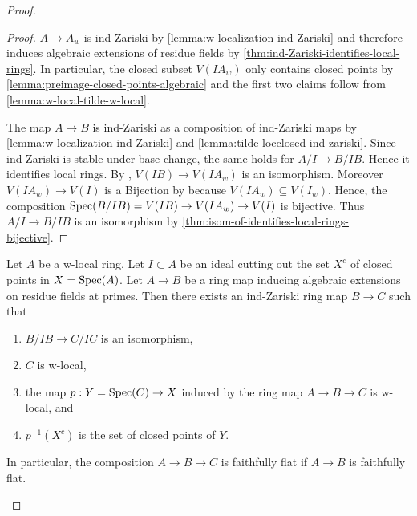 \begin{proof}
\begin{proof}
    $A \to A_w$ is ind-Zariski by \ref{lemma:w-localization-ind-Zariski} and therefore induces
    algebraic extensions of residue fields by \ref{thm:ind-Zariski-identifies-local-rings}.
    In particular, the closed subset $V(I A_w)$ only contains
    closed points by \ref{lemma:preimage-closed-points-algebraic} and
    the first two claims follow from \ref{lemma:w-local-tilde-w-local}.

    The map $A \to B$ is ind-Zariski as a composition of ind-Zariski maps by
    \ref{lemma:w-localization-ind-Zariski} and \ref{lemma:tilde-locclosed-ind-zariski}.
    Since ind-Zariski is stable under base change, the same holds for $A/I \to B/IB$.
    Hence it identifies local rings. By ,
    $V(IB) \to V(I A_w)$ is an isomorphism. Moreover
    $V(I A_{w}) \to V(I)$ is a Bijection by 
    because $V(I A_{w}) \subseteq V(I_w)$. Hence, the composition
    $\mathrm{Spec}(B / IB) = V(IB) \to V(I A_w) \to V(I)$ is bijective. Thus
    $A / I \to B / IB$ is an isomorphism by \ref{thm:isom-of-identifies-local-rings-bijective}.
\end{proof}

\begin{lemma}
\label{thm:closed-points-isom-w-local}
Let $A$ be a w-local ring. Let $I \subset A$ be an ideal cutting out the set $X^c$ of closed points in $X = \operatorname{Spec} (A)$.
Let $A \to B$ be a ring map inducing algebraic extensions on residue fields at primes. Then
there exists an ind-Zariski ring map $B \to C$ such that
\begin{enumerate}
    \item $B/IB \to C/IC$ is an isomorphism, \label{item:quotinet-isom-closed-points-isom-w-local} %
    \item $C$ is w-local, \label{item:w-local-closed-points-isom-w-local}
    \item the map $p: Y = \operatorname{Spec} (C) \to X$ induced by the ring map $A \to B \to C$ is w-local, and %
    \item $p^{-1}(X^c)$ is the set of closed points of $Y$. \label{item:inverse-image-closed-points-isom-w-local}
\end{enumerate}
In particular, the composition $A \to B \to C$ is faithfully flat if $A \to B$ is faithfully flat.
\end{lemma}


\end{proof}
